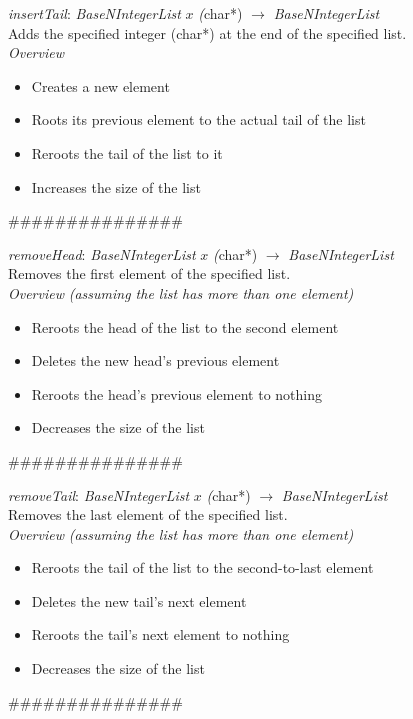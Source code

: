 \documentclass[backcover, english, report, nodocumentinfo]{upmethodology-document}
\newcommand{\nxtalgo}{\centerline{$$$$\#\#\#\#\#\#\#\#\#\#\#\#\#\#\#$$$$}}
\newcommand{\ov}{\emph{Overview}}
\begin{document}
		\begin{minipage}{\linewidth}
			\emph{insertTail}: \emph{BaseNIntegerList} \(x\) \emph(char*) \(\rightarrow\) \emph{BaseNIntegerList}\\
				Adds the specified integer (char*) at the end of the specified list.\\
			\ov
			\begin{itemize}
				\item Creates a new element
				\item Roots its previous element to the actual tail of the list
				\item Reroots the tail of the list to it
				\item Increases the size of the list
			\end{itemize}
			\label{algo:BNIL-InsertTail}
			
		\end{minipage}
		\nxtalgo

		\begin{minipage}{\linewidth}
			\emph{removeHead}: \emph{BaseNIntegerList} \(x\) \emph(char*) \(\rightarrow\) \emph{BaseNIntegerList}\\
				Removes the first element of the specified list.\\
			\ov \emph{ (assuming the list has more than one element)}
			\begin{itemize}
				\item Reroots the head of the list to the second element
				\item Deletes the new head's previous element
				\item Reroots the head's previous element to nothing
				\item Decreases the size of the list
			\end{itemize}
			\label{algo:BNIL-RemoveHead}
			
		\end{minipage}
		\nxtalgo

		\begin{minipage}{\linewidth}
			\emph{removeTail}: \emph{BaseNIntegerList} \(x\) \emph(char*) \(\rightarrow\) \emph{BaseNIntegerList}\\
				Removes the last element of the specified list.\\
			\ov \emph{ (assuming the list has more than one element)}
			\begin{itemize}
				\item Reroots the tail of the list to the second-to-last element
				\item Deletes the new tail's next element
				\item Reroots the tail's next element to nothing
				\item Decreases the size of the list
			\end{itemize}
			\label{algo:BNIL-RemoveTail}
			
		\end{minipage}
		\nxtalgo
\end{document}
